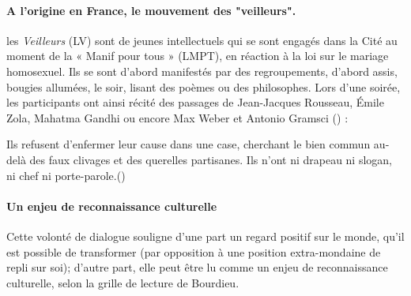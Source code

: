 \paragraph{A l'origine en France, le mouvement des "veilleurs".} les \textit{Veilleurs} (LV) sont de  jeunes intellectuels qui se sont engagés dans la Cité  au moment de la « Manif pour tous » (LMPT), en réaction à la loi sur le mariage homosexuel. Ils se sont d'abord manifestés par des regroupements, d'abord assis, bougies allumées, le soir, lisant des poèmes ou des philosophes. Lors d'une soirée, les participants ont ainsi récité des passages de Jean-Jacques Rousseau, Émile Zola, Mahatma Gandhi ou encore Max Weber et Antonio Gramsci (\cite{geva_non_2019}) :
  \begin{singlequote}
      Ils refusent d'enfermer leur cause dans une case, cherchant le bien commun au-delà des faux clivages et des querelles partisanes.  Ils n'ont ni drapeau ni slogan, ni chef ni porte-parole.(\cite[p. 8]{bes_nos_2014})
      \end{singlequote}

\paragraph{Un enjeu de reconnaissance culturelle} Cette volonté de dialogue souligne d'une part un regard positif sur le monde, qu'il est possible de transformer (par opposition à une position extra-mondaine de repli sur soi); d'autre part, elle peut être lu comme un enjeu de reconnaissance culturelle, selon la grille de lecture de Bourdieu.  
 
